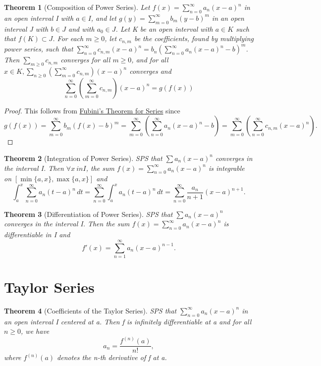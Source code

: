 \documentclass[11pt, oneside]{book}
\theoremstyle{break}
\newtheorem{thm}{Theorem}[section]
\newtheorem*{proof}{Proof}
\begin{document}
\begin{thm}[Composition of Power Series]
	Let $f(x) = \sum\limits_{n=0}^{\infty} a_n (x-a)^n$ in an open interval I with $a \in I$, and let $g(y) = \sum\limits_{m=0}^{\infty} b_m (y-b)^m$ in an open interval J with $b \in J$ and with $a_0 \in J$. Let K be an open interval with $a \in K$ such that $f(K) \subset J$. For each $m \geq 0$, let $c_{n, m}$ be the coefficients, found by multiplying power series, such that $\sum\limits_{n=0}^{\infty} c_{n, m} (x-a)^n = b_n \left( \sum\limits_{n=0}^{\infty} a_n (x-a)^n - b \right)^m$. Then $\sum_{m \geq 0} c_{n, m}$ converges for all $m \geq 0$, and for all $x \in K, \sum\limits_{n \geq 0} \left( \sum\limits_{m = 0}^{\infty} c_{n, m} \right)(x-a)^n$ converges and
	\[
		\sum_{n=0}^{\infty} \left( \sum_{m=0}^{\infty} c_{n, m} \right)(x-a)^n = g(f(x))
	\]
\end{thm}

\begin{proof}
	This follows from \hyperref[fubinithm_series]{Fubini's Theorem for Series} since
	\[
		g(f(x)) = \sum_{m=0}^{\infty} b_m (f(x) - b)^m = \sum_{m=0}^{\infty} \left(\sum_{n=0}^{\infty} a_n (x-a)^n - b \right) = \sum_{m=0}^{\infty} \left( \sum_{n=0}^{\infty} c_{n, m} (x-a)^n \right).
	\]
\end{proof}

\begin{thm}[Integration of Power Series]
	SPS that $\sum a_n (x-a)^n$ converges in the interval I. Then $\forall x\ in I$, the sum $f(x) = \sum_{n=0}^{\infty} a_n (x-a)^n$ is integrable on $[\min\{a, x\}, \max\{a, x\}]$ and
	\[
		\int_{a}^{x} \sum_{n=0}^{\infty} a_n (t-a)^n \, dt = \sum_{n=0}^{\infty} \int_{a}^{x} a_n (t-a)^n \, dt = \sum_{n=0}^{\infty} \frac{a_n}{n+1} (x-a)^{n+1}.
	\]
\end{thm}

\begin{thm}[Differentiation of Power Series]\label{power_series_differentiation}
	SPS that $\sum a_n (x-a)^n$ converges in the interval I. Then the sum $f(x) = \sum_{n=0}^{\infty} a_n (x-a)^n$ is differentiable in I and
	\[
		f'(x) = \sum_{n=1}^{\infty} a_n (x-a)^{n-1}.
	\]
\end{thm}


\section{Taylor Series}

\begin{thm}[Coefficients of the Taylor Series]
	SPS that $\sum_{n=0}^{\infty} a_n (x-a)^n$ in an open interval I centered at a. Then f is infinitely differentiable at a and for all $n \geq 0$, we have
	\[
		a_n = \frac{f^{(n)} (a)}{n!}, 
	\]
	where $f^{(n)}(a)$ denotes the n-th derivative of f at a.
\end{thm}
\end{document}
